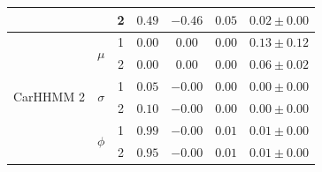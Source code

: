 \begin{table}[]
{\begin{tabular}{ccccccc}
                           &                               & 2                             & $0.49$                         & $-0.46$                     & $0.05$                             & $0.02 \pm 0.00$                             \\ \hline
\multirow{6}{*}{CarHHMM 2} & \multirow{2}{*}{$\mu$}        & 1                             & $0.00$                         & $0.00$                     & $0.00$                             & $0.13 \pm 0.12$                             \\
                           &                               & 2                             & $0.00$                         & $0.00$                     & $0.00$                             & $0.06 \pm 0.02$                             \\
                           & \multirow{2}{*}{$\sigma$}     & 1                             & $0.05$                         & $-0.00$                     & $0.00$                             & $0.00 \pm 0.00$                             \\
                           &                               & 2                             & $0.10$                         & $-0.00$                     & $0.00$                             & $0.00 \pm 0.00$                             \\ 
                           & \multirow{2}{*}{$\phi$}       & 1                             & $0.99$                         & $-0.00$                     & $0.01$                             & $0.01 \pm 0.00$                             \\
                           &                               & 2                             & $0.95$                         & $-0.00$                     & $0.01$                             & $0.01 \pm 0.00$                             \\ \hline
\end{tabular}
}
\label{table:acceleration}
\end{table}




